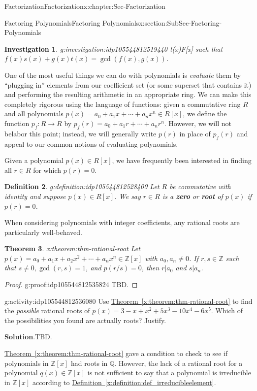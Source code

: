\documentclass[oneside,10pt,]{book}
\newcommand{\blocktitlefont}{\relax}
\newcommand{\xreffont}{\relax}
\newcommand{\terminology}[1]{\textbf{#1}}
\numberwithin{equation}{section}
\def\Z{{\mathbb Z}}
\def\Q{{\mathbb Q}}
\newtheorem{theorem}{Theorem}[section]
\newtheorem{definition}[theorem]{Definition}
\newtheorem{investigation}[theorem]{Investigation}
\begin{document}
\begin{chapterptx}{Factorization}{}{Factorization}{}{}{x:chapter:Sec-Factorization}
\begin{sectionptx}{Factoring Polynomials}{}{Factoring Polynomials}{}{}{x:section:SubSec-Factoring-Polynomials}
\begin{investigation}{}{g:investigation:idp105544812519440}
t(x)\in F[x]\) such that \(f(x) s(x) + g(x) t(x) = \gcd(f(x),g(x))\).%
\end{investigation}%
One of the most useful things we can do with polynomials is \emph{evaluate} them by ``plugging in'' elements from our coefficient set (or some superset that contains it) and performing the resulting arithmetic in an appropriate ring. We can make this completely rigorous using the language of functions: given a commutative ring \(R\) and all polynomials \(p(x) = a_0 + a_1 x + \cdots + a_n x^n \in R[x]\), we define the function \(p_f : R\to R\) by \(p_f(r) = a_0 + a_1 r + \cdots + a_n r^n \). However, we will not belabor this point; instead, we will generally write \(p(r)\) in place of \(p_f(r)\) and appeal to our common notions of evaluating polynomials.%
\par
Given a polynomial \(p(x)\in R[x]\), we have frequently been interested in finding all \(r\in R\) for which \(p(r) = 0\).%
\begin{definition}{}{g:definition:idp105544812528400}%
%
%
Let \(R\) be commutative with identity and suppose \(p(x) \in R[x]\). We say \(r\in R\) is a \terminology{zero} or \terminology{root} of \(p(x)\) if \(p(r) = 0\).%
\end{definition}
When considering polynomials with integer coefficients, any rational roots are particularly well-behaved.%
\begin{theorem}{}{}{x:theorem:thm-rational-root}%
Let \(p(x) = a_0 + a_1 x + a_2 x^2 + \cdots + a_n x^n \in \Z[x]\) with \(a_0,a_n\ne 0\). If \(r,s\in\Z\) such that \(s\ne 0, \gcd(r,s)=1\), and \(p(r/s)=0\), then \(r|a_0\) and \(s|a_n\).%
\end{theorem}
\begin{proof}{}{g:proof:idp105544812535824}
TBD.\end{proof}
\begin{activity}{}{g:activity:idp105544812536080}%
Use \hyperref[x:theorem:thm-rational-root]{Theorem~{\xreffont\ref{x:theorem:thm-rational-root}}} to find the \emph{possible} rational roots of \(p(x) = 3 - x + x^2 + 5x^3 - 10x^4 - 6x^5\). Which of the possibilities you found are actually roots? Justify.%
\par\smallskip%
\noindent\textbf{\blocktitlefont Solution}.\hypertarget{g:solution:idp105544812538000}{}\quad{}TBD.%
\end{activity}%
\hyperref[x:theorem:thm-rational-root]{Theorem~{\xreffont\ref{x:theorem:thm-rational-root}}} gave a condition to check to see if polynomials in \(\Z[x]\) had roots in \(\Q\). However, the lack of a rational root for a polynomial \(q(x)\in \Z[x]\) is not sufficient to say that a polynomial is irreducible in \(\Z[x]\) according to \hyperref[x:definition:def_irreducibleelement]{Definition~{\xreffont\ref{x:definition:def_irreducibleelement}}}.%

\end{sectionptx}
\end{chapterptx}
\end{document}

